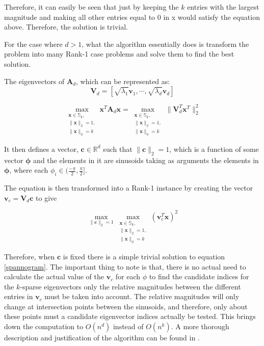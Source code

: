 \documentclass[11pt,a4paper]{article}
\begin{document}
Therefore, it can easily be seen that just by keeping the $k$ entries with the largest magnitude and making all other entries equal to 0 in x would satisfy the equation above. Therefore, the solution is trivial. 

For the case where $d > 1$, what the algorithm essentially does is transform the problem into many Rank-1 case problems and solve them to find the best solution.

The eigenvectors of $\mathbf{A}_d$, which can be represented as:
\begin{equation*}
\mathbf{V}_d = [\sqrt{\lambda_1}\mathbf{v}_1, \cdots, \sqrt{\lambda_d}\mathbf{v}_d]
\end{equation*}

\begin{equation*}
\max_{\substack{\mathbf{x} \in\mathbb{S}_k, \\ \|\mathbf{x}\|_2 = 1, \\ \|\mathbf{x}\|_0 = k}}  \mathbf{x}^T\mathbf{A}_d\mathbf{x} = \max_{\substack{\mathbf{x} \in\mathbb{S}_k, \\ \|\mathbf{x}\|_2 = 1, \\ \|\mathbf{x}\|_0 = k}} \|\mathbf{V}_d^T\mathbf{x}^T\|_2^2
\end{equation*}


It then defines a vector, $\mathbf{c} \in \mathbb{R}^d$ such that $\|\mathbf{c}\|_2=1$, which is a function of some vector $\mathbf{\phi}$ and the elements in it are sinusoids taking as arguments the elements in $\mathbf{\phi}$, where each $\phi_i \in (\frac{-\pi}{2}, \frac{\pi}{2}]$.

The equation is then transformed into a Rank-1 instance by creating the vector $\mathbf{v}_c = \mathbf{V}_d \mathbf{c}$ to give 

\begin{equation}
\max_{\|\mathbf{c}\|_2 =1} \max_{\substack{\mathbf{x} \in\mathbb{S}_k, \\ \|\mathbf{x}\|_2 = 1, \\ \|\mathbf{x}\|_0 = k}}\left(\mathbf{v}_c^T \mathbf{x}\right)^2 
\label{spannogram}
\end{equation}

Therefore, when $\mathbf{c}$ is fixed there is a simple trivial solution to  equation \ref{spannogram}. The important thing to note is that, there is no actual need to calculate the actual value of the $\mathbf{v}_c$ for each $\phi$ to find the candidate indices for the $k$-sparse eigenvectors only the relative magnitudes between the different entries in  $\mathbf{v}_c$ must be taken into account. The relative magnitudes will only change at intersection points between the sinusoids, and therefore, only about these points must a candidate eigenvector indices actually be tested. This brings down the computation to $O \left(n^d\right)$ instead of $O \left(n^k\right)$. A more thorough description and justification of the algorithm can be found in \cite{dimakis}.
\end{document}
